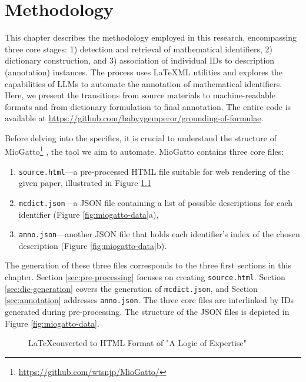 \chapter{Methodology}\label{chapter:methods}

This chapter describes the methodology employed in this research, encompassing three core stages: 1) detection and retrieval of mathematical identifiers, 2) dictionary construction, and 3) association of individual IDs to description (annotation) instances.
The process uses \LaTeX ML utilities and explores the capabilities of \ac{LLMs} to automate the annotation of mathematical identifiers. Here, we present the transitions from source materials to machine-readable formats and from dictionary formulation to final annotation. The entire code is available at \url{https://github.com/babyygemperor/grounding-of-formulae}.

Before delving into the specifics, it is crucial to understand the structure of \\ MioGatto\footnote{\url{https://github.com/wtsnjp/MioGatto/}} \citep{asakura2021miogatto}, the tool we aim to automate. MioGatto contains three core files: 
\begin{enumerate}
    \item \texttt{source.html}—a pre-processed HTML file suitable for web rendering of the given paper, illustrated in Figure \ref{fig:miogatto-sources}
    \item \texttt{mcdict.json}—a JSON file containing a list of possible descriptions for each identifier (Figure \ref{fig:miogatto-data}a), 
    \item \texttt{anno.json}—another JSON file that holds each identifier's index of the chosen description (Figure \ref{fig:miogatto-data}b).
\end{enumerate}

The generation of these three files corresponds to the three first sections in this chapter. 
Section \ref{sec:pre-processing} focuses on creating \texttt{source.html}. 
Section \ref{sec:dic-generation} covers the generation of \texttt{mcdict.json}, and Section \ref{sec:annotation} addresses \texttt{anno.json}. The three core files are interlinked by IDs generated during pre-processing. The structure of the JSON files is depicted in Figure \ref{fig:miogatto-data}.

\begin{figure}[htpb]
  \centering
    \begin{minipage}{1\textwidth}
      
    \end{minipage}
  \caption[LaTeXML Pre-processing]{\LaTeX \space converted to HTML Format of "A Logic of Expertise" \citep{singleton2021logic}}\label{fig:miogatto-sources}
\end{figure}

